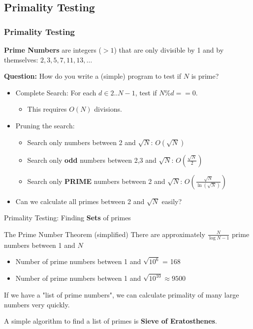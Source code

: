 \subsection{Primality Testing}
\begin{frame}
  \frametitle{Primality Testing}

    {\bf Prime Numbers} are integers ($> 1$) that are only divisible by 1 and by themselves: $2,3,5,7,11,13,\ldots$\bigskip

    {\bf Question:} How do you write a (simple) program to test if $N$ is prime?
    \begin{itemize}

      \item Complete Search: For each $d \in 2..N-1$, test if $N\%d == 0$.
      \begin{itemize}
        \item This requires $O(N)$ divisions.\medskip
      \end{itemize}

      \item Pruning the search:
      \begin{itemize}
        \item Search only numbers between 2 and $\sqrt{N}$: $O(\sqrt{N})$
        \item Search only {\bf odd} numbers between 2,3 and $\sqrt{N}$: $O(\frac{\sqrt{N}}{2})$
        \item Search only {\bf PRIME} numbers between 2 and $\sqrt{N}$:
        $O(\frac{\sqrt{N}}{\ln(\sqrt{N})})$
      \end{itemize}\medskip

      \item Can we calculate all primes between 2 and $\sqrt{N}$ easily?
    \end{itemize}
\end{frame}

\begin{frame}{Primality Testing: Finding {\bf Sets} of primes}

  \begin{block}{The Prime Number Theorem (simplified)}
    There are approximately $\frac{N}{\log{N}-1}$ prime numbers between 1 and $N$
  \end{block}\bigskip

  \begin{itemize}
    \item Number of prime numbers between 1 and $\sqrt{10^6}$ = 168
    \item Number of prime numbers between 1 and $\sqrt{10^{10}} \approx 9500$
  \end{itemize}\bigskip

  If we have a "list of prime numbers", we can calculate primality of
  many large numbers very quickly.\bigskip


  A simple algorithm to find a list of primes is {\bf Sieve of Eratosthenes}.
\end{frame}



